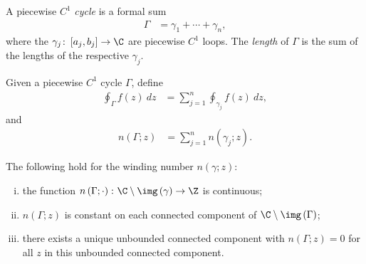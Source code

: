 \documentclass[10pt]{mypackage}
\begin{document}
\begin{definition}
  A piecewise $C^{1}$ \textit{cycle} is a formal sum
  \begin{align*}
    \Gamma &= \gamma_1 + \cdots + \gamma_n,
  \end{align*}
  where the $\gamma_j\colon \left[ a_j,b_j \right]\rightarrow \C$ are piecewise $C^{1}$ loops. The \textit{length} of $\Gamma$ is the sum of the lengths of the respective $\gamma_j$.\newline

  Given a piecewise $C^{1}$ cycle $\Gamma$, define
  \begin{align*}
    \oint_{\Gamma}^{} f(z)\:dz &= \sum_{j=1}^{n} \oint_{\gamma_j}^{} f(z)\:dz,
  \end{align*}
  and
  \begin{align*}
    n\left( \Gamma;z \right) &= \sum_{j=1}^{n}n\left( \gamma_j;z \right).
  \end{align*}
\end{definition}
\begin{proposition}
  The following hold for the winding number $n\left( \gamma;z \right)$:
  \begin{enumerate}[(i)]
    \item the function $n\left( \Gamma;\cdot \right)\colon \C\setminus \img\left( \gamma \right)\rightarrow \Z$ is continuous;
    \item $n\left( \Gamma;z \right)$ is constant on each connected component of $\C\setminus \img\left( \Gamma \right)$;
    \item there exists a unique unbounded connected component with $n\left( \Gamma;z \right) = 0$ for all $z$ in this unbounded connected component.
  \end{enumerate}
\end{proposition}
\end{document}
